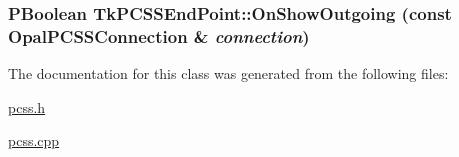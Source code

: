 \hypertarget{classTkPCSSEndPoint_3ba10c4cad067f03cbaeeb0586963b60}{
\subsubsection[{OnShowOutgoing}]{\setlength{\rightskip}{0pt plus 5cm}PBoolean TkPCSSEndPoint::OnShowOutgoing (const OpalPCSSConnection \& {\em connection})}}
\label{classTkPCSSEndPoint_3ba10c4cad067f03cbaeeb0586963b60}




The documentation for this class was generated from the following files:\begin{CompactItemize}
\item 
\hyperlink{pcss_8h}{pcss.h}\item 
\hyperlink{pcss_8cpp}{pcss.cpp}\end{CompactItemize}

